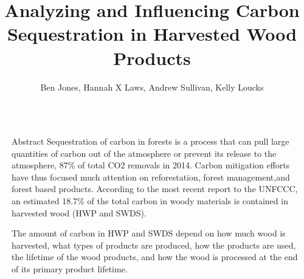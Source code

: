 \documentclass[final]{beamer}\usepackage[]{graphicx}\usepackage[]{color}
\title{Analyzing and Influencing Carbon Sequestration in Harvested Wood Products}
\author{Ben Jones, Hannah X Laws, Andrew Sullivan, Kelly Loucks}
\institute{Department of Mathematical Sciences}
\newlength{\sepwid}
\newlength{\onecolwid}
\begin{document}

\setlength{\belowcaptionskip}{2ex} %
\setlength\belowdisplayshortskip{2ex} %

\begin{frame}[t] %


\begin{columns}[t] %

\begin{column}{\sepwid}\end{column} %

\begin{column}{\onecolwid} %


\begin{alertblock}{Abstract}
Sequestration of carbon in forests is a process that can pull large quantities of carbon out of the atmosphere or prevent its release to the atmosphere, 87\% of total CO2 removals in 2014. Carbon mitigation efforts have thus focused much attention on reforestation, forest management,and forest based products. According to the most recent report to the UNFCCC, an estimated 18.7\% of the total carbon in woody materials is contained in harvested wood (HWP and SWDS).  


The amount of carbon in HWP and SWDS depend on how much wood is harvested, what types of products are produced, how the products are used, the lifetime of the wood products, and how the wood is processed at the end of its primary product lifetime.



\end{alertblock}



\end{column}
\end{columns}
\end{frame}
\end{document}
